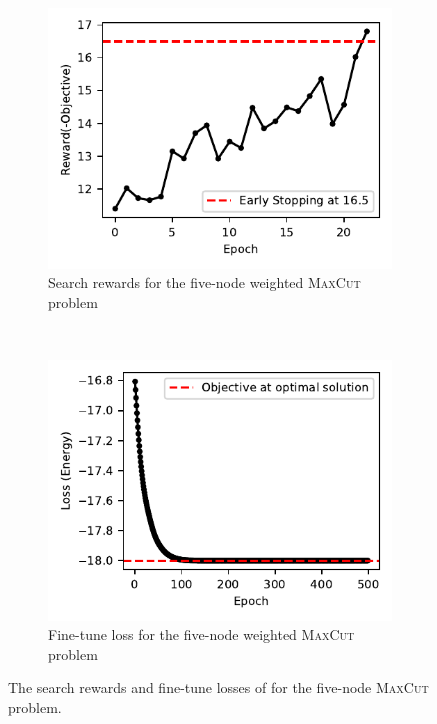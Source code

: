 \documentclass{ieeeaccess}
\begin{document}
\begin{figure}[ht!]
    \centering
    \begin{subfigure}[b]{0.46\linewidth}
        \includegraphics[width=\linewidth]{peiyong_fig_24.pdf}
        \caption{Search rewards for the five-node weighted \textsc{MaxCut} problem}
        \label{fig:qaoa_5q_search}
    \end{subfigure}
    ~ %
    \begin{subfigure}[b]{0.48\linewidth}
        \includegraphics[width=\linewidth]{peiyong_fig_25.pdf}
        \caption{Fine-tune loss for the five-node weighted \textsc{MaxCut} problem}
        \label{fig:qaoa_5q_finetune}
    \end{subfigure}
    \caption{The search rewards and fine-tune losses of for the five-node \textsc{MaxCut} problem.}\label{fig:qaoa_5q_search_and_finetune}
\end{figure}
\end{document}
